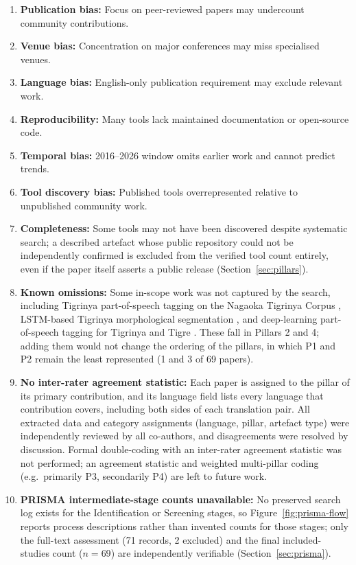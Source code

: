 \documentclass[sn-mathphys-num]{sn-jnl}
\theoremstyle{thmstyleone}
\theoremstyle{thmstyletwo}
\theoremstyle{thmstylethree}
\begin{document}
\begin{enumerate}
    \item \textbf{Publication bias:} Focus on peer-reviewed papers may undercount community contributions.
    \item \textbf{Venue bias:} Concentration on major conferences may miss specialised venues.
    \item \textbf{Language bias:} English-only publication requirement may exclude relevant work.
    \item \textbf{Reproducibility:} Many tools lack maintained documentation or open-source code.
    \item \textbf{Temporal bias:} 2016--2026 window omits earlier work and cannot predict trends.
    \item \textbf{Tool discovery bias:} Published tools overrepresented relative to unpublished community work.
    \item \textbf{Completeness:} Some tools may not have been discovered despite systematic search; a described artefact whose public repository could not be independently confirmed is excluded from the verified tool count entirely, even if the paper itself asserts a public release (Section~\ref{sec:pillars}).
    \item \textbf{Known omissions:} Some in-scope work was not captured by the search, including Tigrinya part-of-speech tagging on the Nagaoka Tigrinya Corpus \citep{tedla_tigrinya_2016}, LSTM-based Tigrinya morphological segmentation \citep{tedla_morphological_2018}, and deep-learning part-of-speech tagging for Tigrinya and Tigre \citep{kapociute_northern_2020}. These fall in Pillars 2 and 4; adding them would not change the ordering of the pillars, in which P1 and P2 remain the least represented (1 and 3 of 69 papers).
    \item \textbf{No inter-rater agreement statistic:} Each paper is assigned to the pillar of its primary contribution, and its language field lists every language that contribution covers, including both sides of each translation pair. All extracted data and category assignments (language, pillar, artefact type) were independently reviewed by all co-authors, and disagreements were resolved by discussion. Formal double-coding with an inter-rater agreement statistic was not performed; an agreement statistic and weighted multi-pillar coding (e.g.\ primarily P3, secondarily P4) are left to future work.
    \item \textbf{PRISMA intermediate-stage counts unavailable:} No preserved search log exists for the Identification or Screening stages, so Figure~\ref{fig:prisma-flow} reports process descriptions rather than invented counts for those stages; only the full-text assessment (71 records, 2 excluded) and the final included-studies count ($n=69$) are independently verifiable (Section~\ref{sec:prisma}).

\end{enumerate}
\end{document}
